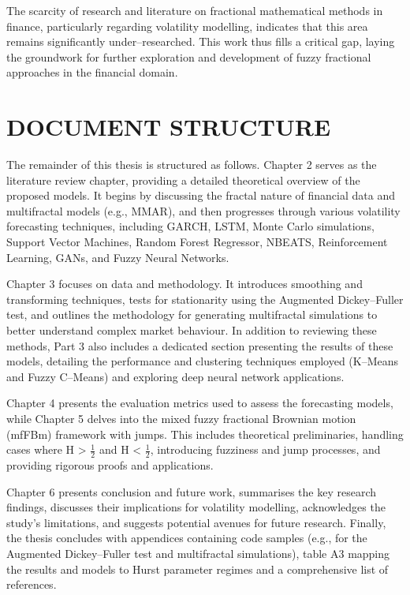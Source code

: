 \documentclass[12pt,a4paper]{report}
\numberwithin{equation}{section}
\begin{document}
The scarcity of research and literature on fractional mathematical
methods in finance, particularly regarding volatility modelling,
indicates that this area remains significantly under--researched. This
work thus fills a critical gap, laying the groundwork for further
exploration and development of fuzzy fractional approaches in the
financial domain.

\hypertarget{document--structure}{%
\section{\texorpdfstring{\textbf{DOCUMENT
STRUCTURE}}{DOCUMENT STRUCTURE}}\label{document--structure}}

The remainder of this thesis is structured as follows. Chapter 2 serves
as the literature review chapter, providing a detailed theoretical
overview of the proposed models. It begins by discussing the fractal
nature of financial data and multifractal models (e.g., MMAR), and then
progresses through various volatility forecasting techniques, including
GARCH, LSTM, Monte Carlo simulations, Support Vector Machines, Random
Forest Regressor, NBEATS, Reinforcement Learning, GANs, and Fuzzy Neural
Networks. 

Chapter 3 focuses on data and methodology. It introduces smoothing and
transforming techniques, tests for stationarity using the Augmented
Dickey--Fuller test, and outlines the methodology for generating
multifractal simulations to better understand complex market behaviour.
In addition to reviewing these methods, Part 3 also includes a
dedicated section presenting the results of these models, detailing the
performance and clustering techniques employed (K--Means and Fuzzy
C--Means) and exploring deep neural network applications.

Chapter 4 presents the evaluation metrics used to assess the forecasting
models, while Chapter 5 delves into the mixed fuzzy fractional Brownian
motion (mfFBm) framework with jumps. This includes theoretical
preliminaries, handling cases where H \textgreater{} $\frac{1}{2}$ and H \textless{}
$\frac{1}{2}$, introducing fuzziness and jump processes, and providing rigorous
proofs and applications.

Chapter 6 presents conclusion and future work, summarises the key research findings, discusses their implications for volatility modelling, acknowledges the study's limitations, and suggests potential avenues for future research.
Finally, the thesis concludes with appendices containing code samples
(e.g., for the Augmented Dickey--Fuller test and multifractal
simulations), table A3 mapping the results and models to Hurst parameter
regimes and a comprehensive list of references.
\end{document}
